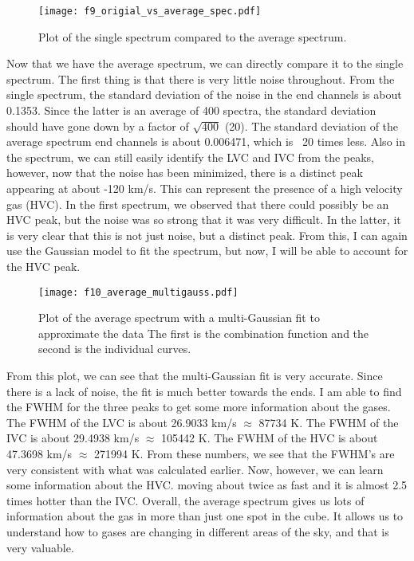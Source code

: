 \documentclass[12pt]{report}
\begin{document}
\begin{figure}[!htb]
\centering
\texttt{[image: f9\_origial\_vs\_average\_spec.pdf]}
\caption{Plot of the single spectrum compared to the average spectrum.}
\label{fig:f5}
\end{figure}
\newpage

Now that we have the average spectrum, we can directly compare it to the single spectrum. 
The first thing is that there is very little noise throughout.
From the single spectrum, the standard deviation of the noise in the end channels is about 0.1353.
Since the latter is an average of 400 spectra, the standard deviation should have gone down by a factor of $\sqrt{400}$ (20).
The standard deviation of the average spectrum end channels is about 0.006471, which is ~20 times less.
Also in the spectrum, we can still easily identify the LVC and IVC from the peaks, however, now that the noise has been minimized, there is a distinct peak appearing at about -120 km/s.
This can represent the presence of a high velocity gas (HVC).
In the first spectrum, we observed that there could possibly be an HVC peak, but the noise was so strong that it was very difficult. 
In the latter, it is very clear that this is not just noise, but a distinct peak.
From this, I can again use the Gaussian model to fit the spectrum, but now, I will be able to account for the HVC peak.
\newpage

\begin{figure}[!htb]
\centering
\texttt{[image: f10\_average\_multigauss.pdf]}
\caption{Plot of the average spectrum with a multi-Gaussian fit to approximate the data The first is the combination function and the second is the individual curves.}
\label{fig:f6}
\end{figure}

From this plot, we can see that the multi-Gaussian fit is very accurate. 
Since there is a lack of noise, the fit is much better towards the ends.
I am able to find the FWHM for the three peaks to get some more information about the gases.
The FWHM of the LVC is about 26.9033 km/s $\approx$ 87734 K.
The FWHM of the IVC is about 29.4938 km/s $\approx$ 105442 K.
The FWHM of the HVC is about 47.3698 km/s $\approx$ 271994 K.
From these numbers, we see that the FWHM's are very consistent with what was calculated earlier.
Now, however, we can learn some information about the HVC. moving about twice as fast and it is almost 2.5 times hotter than the IVC.
Overall, the average spectrum gives us lots of information about the gas in more than just one spot in the cube. 
It allows us to understand how to gases are changing in different areas of the sky, and that is very valuable.
\end{document}

